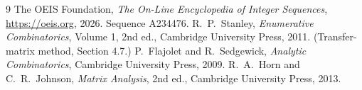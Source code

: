 \documentclass[11pt,a4paper]{article}
\theoremstyle{plain}
\theoremstyle{definition}
\begin{document}
\begin{thebibliography}{9}
 The OEIS Foundation, \emph{The On-Line Encyclopedia of Integer
Sequences}, \url{https://oeis.org}, 2026. Sequence A234476.
 R.~P.~Stanley, \emph{Enumerative Combinatorics}, Volume 1, 2nd ed.,
Cambridge University Press, 2011. (Transfer-matrix method, Section 4.7.)
 P.~Flajolet and R.~Sedgewick, \emph{Analytic Combinatorics}, Cambridge
University Press, 2009.
 R.~A.~Horn and C.~R.~Johnson, \emph{Matrix Analysis}, 2nd ed., Cambridge
University Press, 2013.
\end{thebibliography}
\end{document}
